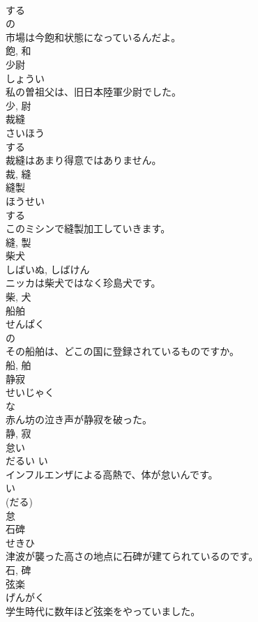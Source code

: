 \documentclass[8pt]{extreport}
\begin{document}
\begin{CJK}{UTF8}{min}
\\	する 
\\	の 
\\	市場は今飽和状態になっているんだよ。	
\\	飽, 和	
\\	少尉	
\\	しょうい	
\\	私の曽祖父は、旧日本陸軍少尉でした。	
\\	少, 尉	
\\	裁縫	
\\	さいほう	
\\	する 
\\	裁縫はあまり得意ではありません。	
\\	裁, 縫	
\\	縫製	
\\	ほうせい	
\\	する 
\\	このミシンで縫製加工していきます。	
\\	縫, 製	
\\	柴犬	
\\	しばいぬ, しばけん	
\\	ニッカは柴犬ではなく珍島犬です。	
\\	柴, 犬	
\\	船舶	
\\	せんぱく	
\\	の 
\\	その船舶は、どこの国に登録されているものですか。	
\\	船, 舶	
\\	静寂	
\\	せいじゃく	
\\	な 
\\	赤ん坊の泣き声が静寂を破った。	
\\	静, 寂	
\\	怠い	
\\	だるい	い 
\\	インフルエンザによる高熱で、体が怠いんです。	
\\	い 
\\	(だる) 
\\	怠	
\\	石碑	
\\	せきひ	
\\	津波が襲った高さの地点に石碑が建てられているのです。	
\\	石, 碑	
\\	弦楽	
\\	げんがく	
\\	学生時代に数年ほど弦楽をやっていました。	

\end{CJK}
\end{document}
